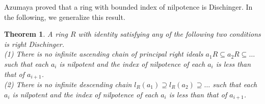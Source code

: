 \documentclass[12pt]{article}
\theoremstyle{plain}
\newtheorem{thm}{Theorem}[section]
\theoremstyle{definition}
\begin{document}
	
	Azumaya \cite[Theorem 4]{Az} proved that a ring with bounded index of nilpotence is Dischinger. In the following, we generalize this result.
	\begin{thm}\label{D.GenAzumaya}
		A ring $R$ with identity satisfying any of the following two conditions is right Dischinger.\\[2mm]
		\textup{(1)} There is no infinite ascending chain of principal right ideals $a_1R \subseteq a_2R \subseteq \ldots$ such that each $a_i$ is nilpotent and the index of nilpotence of each $a_i$ is less than that	of $a_{i+1}$.\\[2mm]
		\textup{(2)} There is no infinite descending chain $l_R(a_1) \supseteq l_R(a_2) \supseteq \ldots$ such that each $a_i$ is nilpotent and the index of nilpotence of each $a_i$ is less than that	of $a_{i+1}$.
	\end{thm}
\end{document}
